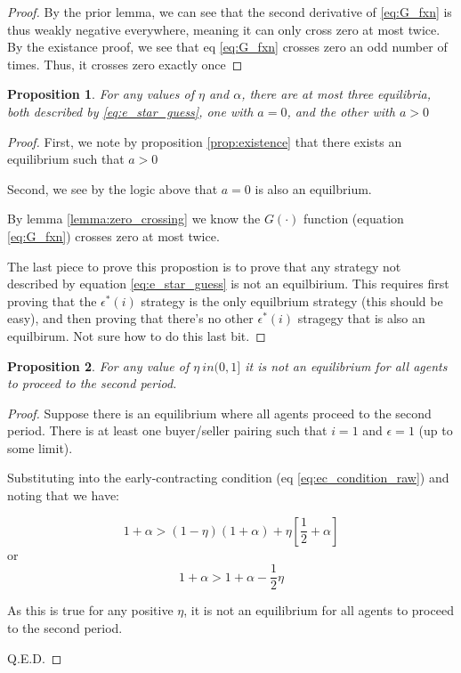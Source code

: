 \documentclass[WP]{AEA}
\newtheorem{prop}{Proposition}
\begin{document}
\begin{proof}
	By the prior lemma, we can see that the second derivative of \ref{eq:G_fxn} is thus weakly negative everywhere, meaning it can only cross zero at most twice.  By the existance proof, we see that eq \ref{eq:G_fxn} crosses zero an odd number of times. Thus, it crosses zero exactly once
	
\end{proof}
\begin{prop}\label{prop:three_eq}
	For any values of $\eta$ and $\alpha$, there are at most three equilibria, both described by \ref{eq:e_star_guess}, one with $a = 0$, and the other with $a > 0$
\end{prop}
\begin{proof}
	First, we note by proposition \ref{prop:existence} that there exists an equilibrium such that $a > 0$
	
	Second, we see by the logic above that $a = 0$ is also an equilbrium.
	
	By lemma \ref{lemma:zero_crossing} we know the $G(\cdot)$ function (equation \ref{eq:G_fxn}) crosses zero at most twice.
	
	The last piece to prove this propostion is to prove that any strategy not described by equation \ref{eq:e_star_guess} is not an equilbirium.  This requires first proving that the $\epsilon^*(i)$ strategy is the only equilbrium strategy (this should be easy), and then proving that there's no  other  $\epsilon^*(i)$ stragegy that is also an equilbirum. Not sure how to do this last bit.
	
\end{proof}	

\begin{prop}
	For any value of $\eta \ in (0, 1]$ it is not an equilibrium for all agents to proceed to the second period. 
\end{prop}

\begin{proof}
	Suppose there is an equilibrium where all agents proceed to the second period. There is at least one buyer/seller pairing such that $i = 1$ and $\epsilon = 1$ (up to some limit).
	
	Substituting into the early-contracting condition (eq \ref{eq:ec_condition_raw}) and noting that we have:
	
	\begin{equation*}
		1+\alpha >(1-\eta)(1+\alpha ) + \eta  \left[ \frac{1}{2} + \alpha \right] 
	\end{equation*}
	or	
	\begin{equation*}
		1+\alpha > 1+\alpha   -  \frac{1}{2}\eta   
	\end{equation*}
	
	As this is true for any positive $\eta$, it is not an equilibrium for all agents to proceed to the second period.
	
	Q.E.D.
\end{proof}	
\end{document}
